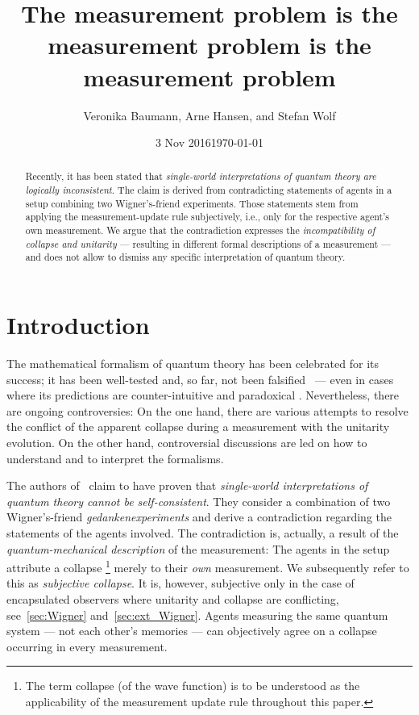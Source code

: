 \documentclass[aps,pra,12pt]{revtex4-2}
\theoremstyle{definition}
\theoremstyle{remark}
\begin{document}
\date{3 Nov 2016}

\title{The measurement problem is the measurement problem is the measurement problem} 
\author{Veronika Baumann, Arne Hansen, and Stefan Wolf}

\date{\today}

\begin{abstract}
\noindent
Recently, it has been stated that {\em single-world interpretations of quantum theory are logically inconsistent\/}. 
The claim is derived from contradicting statements of agents in a setup combining two Wigner's-friend experiments.
Those statements stem from applying the measurement-update rule subjectively, i.e., only for the respective agent's own measurement.
We argue that the contradiction expresses the {\em incompatibility of collapse and unitarity\/} --- resulting in different formal descriptions of a measurement --- and does not allow to dismiss any specific interpretation of quantum theory. 
\end{abstract}

\maketitle

\newpage
\section{Introduction}
\noindent

The mathematical formalism of quantum theory has been celebrated for its success; it has been well-tested and, so far, not been falsified~\cite{Popper1934} --- even in cases where its predictions are counter-intuitive and paradoxical \cite{aspect1982experimental,bouwmeester1997experimental,stefanov2002quantum,ma2012experimental,denkmayr2014observation}. 
Nevertheless, there are ongoing controversies: On the one hand, there are various attempts to resolve the conflict of the apparent collapse during a measurement with the unitarity evolution. 
On the other hand, controversial discussions are led on how to understand and to interpret the formalisms. 

The authors of~\cite{FrRen} claim to have proven that \emph{single-world interpretations of quantum theory cannot be self-consistent}. 
They consider a combination of two Wigner's-friend \emph{gedankenexperiments} and derive a contradiction regarding the statements of the agents involved. 
The contradiction is, actually, a result of the \emph{quantum-mechanical description} of the measurement:
The agents in the setup attribute a collapse \footnote{The term collapse (of the wave function) is to be understood as the applicability of the measurement update rule throughout this paper.} merely to their \emph{own} measurement. 
We subsequently refer to this as \emph{subjective collapse}. 
It is, however, subjective only in the case of encapsulated observers where unitarity and collapse are conflicting, see~\ref{sec:Wigner} and~\ref{sec:ext_Wigner}. 
Agents measuring the same quantum system --- not each other's memories --- can objectively agree on a collapse occurring in every measurement.
\end{document}
